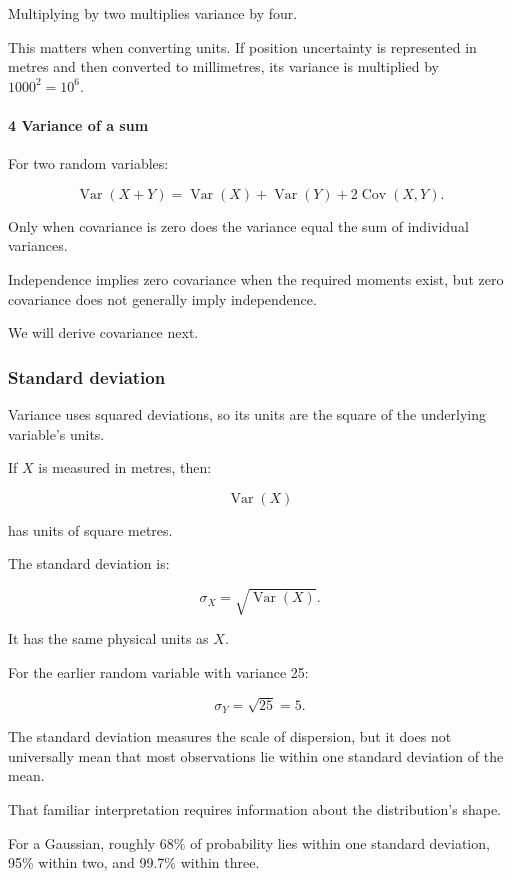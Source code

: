 Multiplying by two multiplies variance by four.

This matters when converting units. If position uncertainty is represented in metres and then converted to millimetres, its variance is multiplied by \(1000^2=10^6\).

\paragraph{4 Variance of a sum}\label{variance-of-a-sum}

For two random variables:

\[
 \operatorname{Var}(X+Y) = \operatorname{Var}(X)+ \operatorname{Var}(Y)+ 2\operatorname{Cov}(X,Y).
\]

Only when covariance is zero does the variance equal the sum of individual variances.

Independence implies zero covariance when the required moments exist, but zero covariance does not generally imply independence.

We will derive covariance next.

\subsubsection{Standard deviation}\label{standard-deviation}

Variance uses squared deviations, so its units are the square of the underlying variable's units.

If \(X\) is measured in metres, then:

\[
 \operatorname{Var}(X)
\]

has units of square metres.

The standard deviation is:

\[
 \boxed{ \sigma_X=\sqrt{\operatorname{Var}(X)} }.
\]

It has the same physical units as \(X\).

For the earlier random variable with variance 25:

\[
 \sigma_Y=\sqrt{25}=5.
\]

The standard deviation measures the scale of dispersion, but it does not universally mean that most observations lie within one standard deviation of the mean.

That familiar interpretation requires information about the distribution's shape.

For a Gaussian, roughly 68\% of probability lies within one standard deviation, 95\% within two, and 99.7\% within three.

